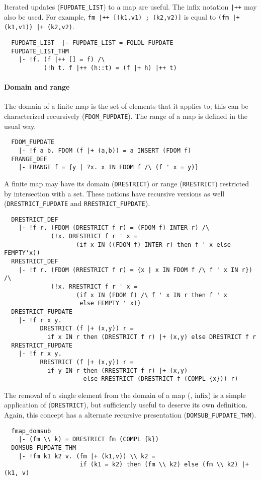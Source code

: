 Iterated updates ({\small\verb+FUPDATE_LIST+}) to a map are
useful. The infix notation \verb#|++# may also be used.
For example, {\small\verb#fm |++ [(k1,v1) ; (k2,v2)]#} is equal
to {\small\verb#(fm |+ (k1,v1)) |+ (k2,v2)#}.
%
{\small
\begin{verbatim}
  FUPDATE_LIST  |- FUPDATE_LIST = FOLDL FUPDATE
  FUPDATE_LIST_THM
    |- !f. (f |++ [] = f) /\
           (!h t. f |++ (h::t) = (f |+ h) |++ t)
\end{verbatim}
}


\paragraph {Domain and range}

The domain of a finite map is the set of elements that it applies to;
this can be characterized recursively
({\small\verb+FDOM_FUPDATE+}). The range of a map is defined in the
usual way.
{\small
\begin{verbatim}
  FDOM_FUPDATE
    |- !f a b. FDOM (f |+ (a,b)) = a INSERT (FDOM f)
  FRANGE_DEF
    |- FRANGE f = {y | ?x. x IN FDOM f /\ (f ' x = y)}
\end{verbatim}
}
%
A finite map may have its domain ({\small\verb+DRESTRICT+})
or range ({\small\verb+RRESTRICT+}) restricted by intersection with a
set. These notions have recursive versions as well
({\small\verb+DRESTRICT_FUPDATE+} and {\small\verb+RRESTRICT_FUPDATE+}).
%
{\small
\begin{verbatim}
  DRESTRICT_DEF
    |- !f r. (FDOM (DRESTRICT f r) = (FDOM f) INTER r) /\
             (!x. DRESTRICT f r ' x =
                    (if x IN ((FDOM f) INTER r) then f ' x else FEMPTY'x))
  RRESTRICT_DEF
    |- !f r. (FDOM (RRESTRICT f r) = {x | x IN FDOM f /\ f ' x IN r}) /\
             (!x. RRESTRICT f r ' x =
                    (if x IN (FDOM f) /\ f ' x IN r then f ' x
                     else FEMPTY ' x))
  DRESTRICT_FUPDATE
    |- !f r x y.
          DRESTRICT (f |+ (x,y)) r =
            if x IN r then (DRESTRICT f r) |+ (x,y) else DRESTRICT f r
  RRESTRICT_FUPDATE
    |- !f r x y.
          RRESTRICT (f |+ (x,y)) r =
            if y IN r then (RRESTRICT f r) |+ (x,y)
                      else RRESTRICT (DRESTRICT f (COMPL {x})) r)
\end{verbatim}
}
\noindent The removal of a single element from the domain of a map
(\holtxt{\bs\bs}, infix) is a simple application of
({\small\verb+DRESTRICT+}), but sufficiently useful to deserve its own
definition. Again, this concept has a alternate recursive presentation
({\small\verb+DOMSUB_FUPDATE_THM+}).
%
{\small
\begin{verbatim}
  fmap_domsub
    |- (fm \\ k) = DRESTRICT fm (COMPL {k})
  DOMSUB_FUPDATE_THM
    |- !fm k1 k2 v. (fm |+ (k1,v)) \\ k2 =
                     if (k1 = k2) then (fm \\ k2) else (fm \\ k2) |+ (k1, v)
\end{verbatim}
}

